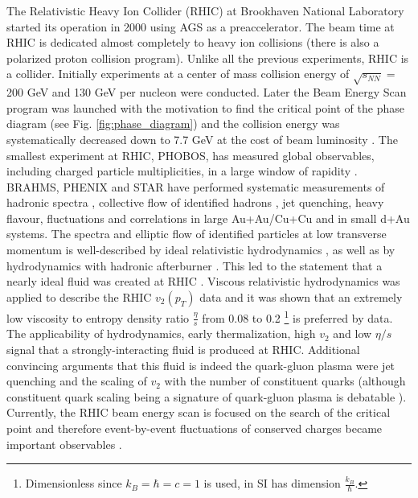 The Relativistic Heavy Ion Collider (RHIC) at Brookhaven National Laboratory
started its operation in 2000 using AGS as a preaccelerator. The beam time at RHIC is
dedicated almost completely to heavy ion collisions (there is also a polarized
proton collision program). Unlike all the previous experiments, RHIC is a
collider. Initially experiments at a center of mass collision energy of
$\sqrt{s_{NN}} = $ 200 GeV and 130 GeV per nucleon were conducted. Later the
Beam Energy Scan program was launched with the motivation to find the critical
point of the phase diagram (see Fig. \ref{fig:phase_diagram}) and the collision
energy was systematically decreased down to 7.7 GeV at the cost of beam
luminosity \cite{RHIC_lumi}. The smallest experiment at RHIC, PHOBOS, has
measured global observables, including charged particle multiplicities, in a
large window of rapidity \cite{Alver:2010ck}.  BRAHMS, PHENIX and STAR have
performed systematic measurements of hadronic spectra
\cite{Chujo:2002bi,Kumar:2011us}, collective flow of identified hadrons
\cite{Agakishiev:2011eq,Lacey:2001va}, jet quenching, heavy flavour,
fluctuations and correlations in large Au+Au/Cu+Cu and in small d+Au
systems.  The spectra and elliptic flow of identified particles at low
transverse momentum is well-described by  ideal relativistic hydrodynamics
\cite{Kolb:2000fha,Huovinen:2001cy,Hirano:2002ds}, as well as by hydrodynamics
with hadronic afterburner \cite{Teaney:2001gc}.  This led to the statement that a
nearly ideal fluid was created at RHIC
\cite{Adams:2005dq,Adcox:2004mh,Arsene:2004fa,Back:2004je}. Viscous
relativistic hydrodynamics was applied to describe the RHIC $v_2(p_T)$ data
\cite{Song:2007ux,Dusling:2007gi,Romatschke:2007mq} and it was shown that an
extremely low viscosity to entropy density ratio $\frac{\eta}{s}$ from 0.08 to
0.2 \footnote{Dimensionless since $k_B = \hbar = c = 1$ is used, in SI has
dimension $\frac{k_B}{\hbar}$.} is preferred by data. The applicability of
hydrodynamics, early thermalization, high $v_2$ and low $\eta/s$ signal that
a strongly-interacting fluid is produced at RHIC.  Additional convincing
arguments that this fluid is indeed the quark-gluon plasma were jet quenching
\cite{Betz:2012hv}  and the scaling of $v_2$ with the number of constituent quarks
\cite{Xu:2005jt,Adamczyk:2013gv} (although constituent quark scaling being a
signature of quark-gluon plasma is debatable \cite{Lu:2006qn}).  Currently, the RHIC
beam energy scan is focused on the search of the critical point and therefore
event-by-event fluctuations of conserved charges became important observables
\cite{Adamczyk:2013dal}.

